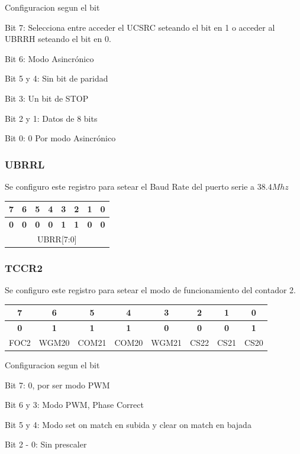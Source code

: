 \documentclass[10pt,spanish,a4paper,openany,notitlepage]{article}
\begin{document}
\begin{description}
\item{Configuracion segun el bit}
\item{Bit 7}: Selecciona entre acceder el UCSRC seteando el bit en 1 o acceder al UBRRH seteando el bit en 0.
\item{Bit 6}: Modo Asincrónico
\item{Bit 5 y 4}: Sin bit de paridad
\item{Bit 3}: Un bit de STOP
\item{Bit 2 y 1}: Datos de 8 bits
\item{Bit 0}: 0 Por modo Asincrónico
\end{description}

\subsubsection{UBRRL}
Se configuro este registro para setear el Baud Rate del puerto serie a $38.4Mhz$
\begin{center}
\begin{tabular}{|c|c|c|c|c|c|c|c|}\hline
7&6&5&4&3&2&1&0\\\hline
\textbf{0}&\textbf{0}&\textbf{0}&\textbf{0}&\textbf{1}&\textbf{1}&\textbf{0}&\textbf{0}\\\hline
\multicolumn{8}{|c|}{UBRR[7:0]}\\\hline
\end{tabular}
\end{center}

\subsubsection{TCCR2}\label{TCCR2}
Se configuro este registro para setear el modo de funcionamiento del contador 2. 
\begin{center}
\begin{tabular}{|c|c|c|c|c|c|c|c|}\hline
7&6&5&4&3&2&1&0\\\hline
\textbf{0}&\textbf{1}&\textbf{1}&\textbf{1}&\textbf{0}&\textbf{0}&\textbf{0}&\textbf{1}\\\hline
FOC2&WGM20&COM21&COM20&WGM21&CS22&CS21&CS20\\\hline
\end{tabular}
\end{center}

\begin{description}
\item{Configuracion segun el bit}
\item{Bit 7}: 0, por ser modo PWM
\item{Bit 6 y 3}: Modo PWM, Phase Correct
\item{Bit 5 y 4}: Modo set on match en subida y clear on match en bajada
\item{Bit 2 - 0}: Sin prescaler
\end{description}
\end{document}
